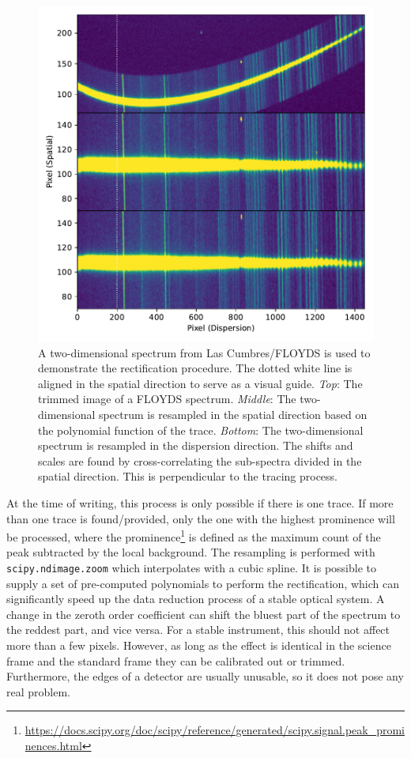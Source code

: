 \documentclass[linenumbers, twocolumn]{aastex631}
\begin{document}
\begin{figure}
    \centering
    \includegraphics[width=\columnwidth]{fig_02_rectification.pdf}
    \caption{A two-dimensional spectrum from Las Cumbres/FLOYDS is used to demonstrate
    the rectification procedure. The dotted white line is aligned in the
    spatial direction to serve as a visual guide. \textit{Top}: The trimmed image of a
    FLOYDS spectrum. \textit{Middle}: The two-dimensional spectrum is resampled in the
    spatial direction based on the polynomial function of the trace. \textit{Bottom}:
    The two-dimensional spectrum is resampled in the dispersion direction. The
    shifts and scales are found by cross-correlating the sub-spectra divided in
    the spatial direction. This is perpendicular to the tracing process.}
    \label{fig:rectify}
\end{figure}

At the time of writing, this process is only possible if there is one trace. If
more than one trace is found/provided, only the one with the highest prominence
will be processed, where the 
prominence\footnote{\url{https://docs.scipy.org/doc/scipy/reference/generated/scipy.signal.peak_prominences.html}}
is defined as the maximum count of the peak subtracted by the local background. 
The resampling is performed with \texttt{scipy.ndimage.zoom} 
which interpolates with a cubic spline. It is possible to supply a set of
pre-computed polynomials to perform the rectification, which can significantly
speed up the data reduction process of a stable optical system. A change in the 
zeroth order coefficient can shift the bluest part of the spectrum to the
reddest part, and vice versa. For a stable instrument, this should not affect
more than a few pixels. However, as long as the effect is identical in the science
frame and the standard frame they can be calibrated out or trimmed. Furthermore,
the edges of a detector are usually unusable, so it does not pose any real
problem.
\end{document}
